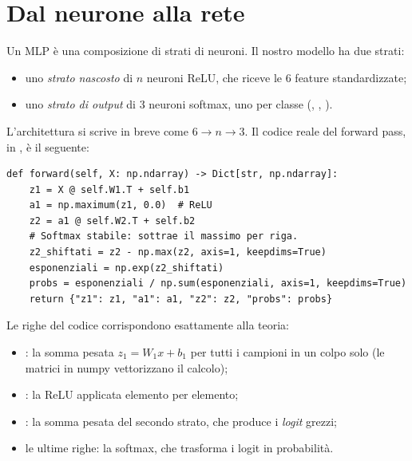 \section{Dal neurone alla rete}\label{sec:dal-neurone-alla-rete}

Un MLP è una composizione di strati di neuroni. Il nostro modello ha due
strati:

\begin{itemize}
  \item uno \emph{strato nascosto} di $n$ neuroni ReLU, che riceve le 6
        feature standardizzate;
  \item uno \emph{strato di output} di 3 neuroni softmax, uno per classe
        (, , ).
\end{itemize}

L'architettura si scrive in breve come $6 \to n \to 3$. Il codice reale del
forward pass, in , è il
seguente:

\begin{lstlisting}[caption={Forward pass del MLP in \file{mlp.py} (metodo \codice{forward}).}]
def forward(self, X: np.ndarray) -> Dict[str, np.ndarray]:
    z1 = X @ self.W1.T + self.b1
    a1 = np.maximum(z1, 0.0)  # ReLU
    z2 = a1 @ self.W2.T + self.b2
    # Softmax stabile: sottrae il massimo per riga.
    z2_shiftati = z2 - np.max(z2, axis=1, keepdims=True)
    esponenziali = np.exp(z2_shiftati)
    probs = esponenziali / np.sum(esponenziali, axis=1, keepdims=True)
    return {"z1": z1, "a1": a1, "z2": z2, "probs": probs}
\end{lstlisting}

Le righe del codice corrispondono esattamente alla teoria:

\begin{itemize}
  \item {}: la somma pesata
        $z_1 = W_1 x + b_1$ per tutti i campioni in un colpo solo (le
        matrici in numpy vettorizzano il calcolo);
  \item {}: la ReLU applicata elemento per
        elemento;
  \item {}: la somma pesata del secondo
        strato, che produce i \emph{logit} grezzi;
  \item le ultime righe: la softmax, che trasforma i logit in probabilità.
\end{itemize}

